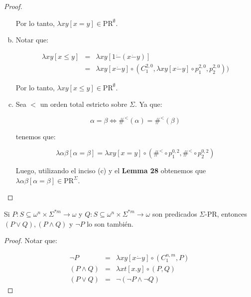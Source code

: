 \begin{proof}
\begin{enumerate}[a)]
        \PN Por lo tanto, $\lambda xy \left[x=y\right] \in \mathrm{PR}^{\emptyset}$.

      \item Notar que:

        \begin{eqnarray*}
          \lambda xy \left[x \leq y\right] &=& \lambda xy\left[1 \dot{-}(x \dot{-}y)\right] \\
          &=& \lambda xy \left[x \dot{-}y\right] \circ (C_{1}^{2,0}, \lambda xy \left[x \dot{-}y\right] \circ
            p_{1}^{2,0}, p_{2}^{2,0}))
        \end{eqnarray*}

        \PN Por lo tanto, $\lambda xy \left[x \leq y\right] \in \mathrm{PR}^{\emptyset}$.

      \item Sea $<$ un orden total estricto sobre $\Sigma$. Ya que:

        \[
          \alpha = \beta \Leftrightarrow \#^{<}(\alpha) = \#^{<}(\beta)
        \]

        \PN tenemos que:

        \[
          \lambda \alpha\beta \left[\alpha=\beta\right] = \lambda xy \left[x=y\right] \circ (\#^{<} \circ p_{1}^{0,2},
          \#^{<} \circ p_{2}^{0,2})
        \]

        \PN Luego, utilizando el inciso (c) y el \textbf{Lemma 28} obtenemos que $\lambda \alpha\beta
        \left[\alpha=\beta\right] \in \mathrm{PR}^{\Sigma}$.
    \end{enumerate}
  \end{proof}

  \begin{lemma}
    \PN Si $P: S \subseteq \omega^{n} \times \Sigma^{\ast m} \rightarrow \omega$ y $Q: S \subseteq \omega^{n} \times
    \Sigma^{\ast m} \rightarrow \omega$ son predicados $\Sigma$-PR, entonces $(P \vee Q), (P \wedge Q)$ y $\neg P$ lo
    son también.
  \end{lemma}
  \begin{proof}
    \PN Notar que:

    \begin{eqnarray*}
      \neg P &=& \lambda xy \left[x \dot{-} y\right] \circ (C_{1}^{n, m}, P) \\
      (P \wedge Q) &=& \lambda xt \left[x.y\right] \circ (P, Q) \\
      (P \vee Q) &=& \neg (\neg P \wedge \neg Q)
    \end{eqnarray*}
  \end{proof}

